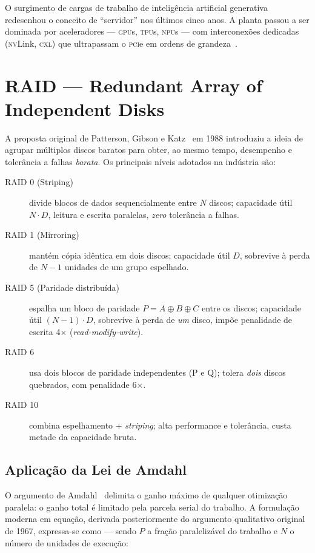 O surgimento de cargas de trabalho de inteligência artificial
generativa redesenhou o conceito de ``servidor'' nos últimos cinco
anos. A planta passou a ser dominada por aceleradores
--- \textsc{gpu}s, \textsc{tpu}s, \textsc{npu}s --- com interconexões
dedicadas (\textsc{nv}Link, \textsc{cxl}) que ultrapassam o
\textsc{pci}e em ordens de grandeza~\cite{nvidia2023grace}.

\section{RAID --- Redundant Array of Independent Disks}
\label{sec:ref-raid}

A proposta original de Patterson, Gibson e Katz~\cite{patterson1988}
em 1988 introduziu a ideia de agrupar múltiplos discos baratos para
obter, ao mesmo tempo, desempenho e tolerância a falhas
\textit{barata}. Os principais níveis adotados na indústria são:

\begin{description}
    \item[RAID 0 (Striping)] divide blocos de dados sequencialmente
          entre $N$ discos; capacidade útil $N \cdot D$, leitura e
          escrita paralelas, \emph{zero} tolerância a falhas.
    \item[RAID 1 (Mirroring)] mantém cópia idêntica em dois discos;
          capacidade útil $D$, sobrevive à perda de $N-1$ unidades
          de um grupo espelhado.
    \item[RAID 5 (Paridade distribuída)] espalha um bloco de paridade
          $P = A \oplus B \oplus C$ entre os discos; capacidade útil
          $(N-1) \cdot D$, sobrevive à perda de \emph{um} disco,
          impõe penalidade de escrita 4$\times$ (\textit{read-modify-write}).
    \item[RAID 6] usa dois blocos de paridade independentes (P e Q);
          tolera \emph{dois} discos quebrados, com penalidade 6$\times$.
    \item[RAID 10] combina espelhamento + \textit{striping}; alta
          performance e tolerância, custa metade da capacidade bruta.
\end{description}

\subsection{Aplicação da Lei de Amdahl}

O argumento de Amdahl~\cite{amdahl1967} delimita o ganho máximo de
qualquer otimização paralela: o ganho total é limitado pela parcela
serial do trabalho. A formulação moderna em equação, derivada
posteriormente do argumento qualitativo original de 1967, expressa-se
como --- sendo $P$ a fração paralelizável do trabalho e $N$ o número
de unidades de execução:


